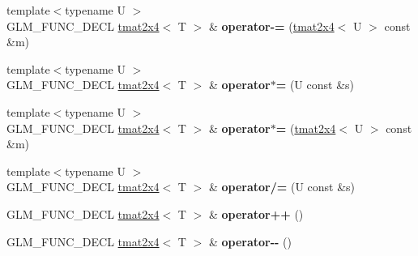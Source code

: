 \begin{DoxyCompactItemize}
\item 
\hypertarget{structglm_1_1detail_1_1tmat2x4_a61a215f6a9add582e906dba9c363d15e}{{\footnotesize template$<$typename U $>$ }\\G\-L\-M\-\_\-\-F\-U\-N\-C\-\_\-\-D\-E\-C\-L \hyperlink{structglm_1_1detail_1_1tmat2x4}{tmat2x4}$<$ T $>$ \& {\bfseries operator-\/=} (\hyperlink{structglm_1_1detail_1_1tmat2x4}{tmat2x4}$<$ U $>$ const \&m)}\label{structglm_1_1detail_1_1tmat2x4_a61a215f6a9add582e906dba9c363d15e}

\item 
\hypertarget{structglm_1_1detail_1_1tmat2x4_a179dd28345527b13581fea3cbf777a1f}{{\footnotesize template$<$typename U $>$ }\\G\-L\-M\-\_\-\-F\-U\-N\-C\-\_\-\-D\-E\-C\-L \hyperlink{structglm_1_1detail_1_1tmat2x4}{tmat2x4}$<$ T $>$ \& {\bfseries operator$\ast$=} (U const \&s)}\label{structglm_1_1detail_1_1tmat2x4_a179dd28345527b13581fea3cbf777a1f}

\item 
\hypertarget{structglm_1_1detail_1_1tmat2x4_a12a4c46c44545ccf5dcd7c88af5c40aa}{{\footnotesize template$<$typename U $>$ }\\G\-L\-M\-\_\-\-F\-U\-N\-C\-\_\-\-D\-E\-C\-L \hyperlink{structglm_1_1detail_1_1tmat2x4}{tmat2x4}$<$ T $>$ \& {\bfseries operator$\ast$=} (\hyperlink{structglm_1_1detail_1_1tmat2x4}{tmat2x4}$<$ U $>$ const \&m)}\label{structglm_1_1detail_1_1tmat2x4_a12a4c46c44545ccf5dcd7c88af5c40aa}

\item 
\hypertarget{structglm_1_1detail_1_1tmat2x4_a88d10ace55666225b70d7f2cdd05d784}{{\footnotesize template$<$typename U $>$ }\\G\-L\-M\-\_\-\-F\-U\-N\-C\-\_\-\-D\-E\-C\-L \hyperlink{structglm_1_1detail_1_1tmat2x4}{tmat2x4}$<$ T $>$ \& {\bfseries operator/=} (U const \&s)}\label{structglm_1_1detail_1_1tmat2x4_a88d10ace55666225b70d7f2cdd05d784}

\item 
\hypertarget{structglm_1_1detail_1_1tmat2x4_aad6b04f50e7c4a7e4f3ccb22c0a4045d}{G\-L\-M\-\_\-\-F\-U\-N\-C\-\_\-\-D\-E\-C\-L \hyperlink{structglm_1_1detail_1_1tmat2x4}{tmat2x4}$<$ T $>$ \& {\bfseries operator++} ()}\label{structglm_1_1detail_1_1tmat2x4_aad6b04f50e7c4a7e4f3ccb22c0a4045d}

\item 
\hypertarget{structglm_1_1detail_1_1tmat2x4_a39cc3e39c18aab49e20b7188606bc261}{G\-L\-M\-\_\-\-F\-U\-N\-C\-\_\-\-D\-E\-C\-L \hyperlink{structglm_1_1detail_1_1tmat2x4}{tmat2x4}$<$ T $>$ \& {\bfseries operator-\/-\/} ()}\label{structglm_1_1detail_1_1tmat2x4_a39cc3e39c18aab49e20b7188606bc261}


\end{DoxyCompactItemize}
